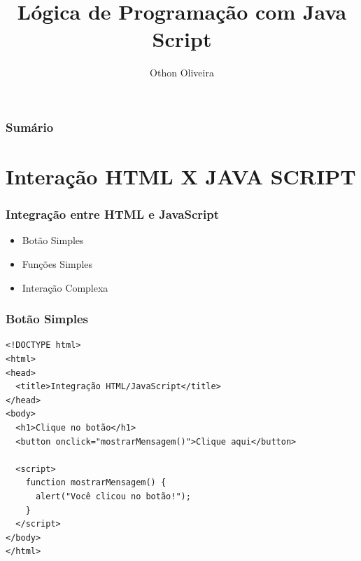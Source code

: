 \documentclass[13pt, xcolor={dvipsnames,svgnames}, portuguese]{beamer}
\author{Othon Oliveira}
\title{Lógica de Programação com Java Script}
\institute{SENAC - PROA}
\date{}
\begin{document}
\begin{frame}
\titlepage
\end{frame}

\newcommand{\capa}{
    \begin{tikzpicture}[remember picture,overlay]
        \node at (current page.south west)
            {\begin{tikzpicture}[remember picture, overlay]
                \fill[shading=radial,top color=orange,bottom color=orange,middle color=yellow] (0,0) rectangle (\paperwidth,\paperheight);
            \end{tikzpicture}
          };
    \end{tikzpicture}
}

\begin{frame}\frametitle{Sumário}
\tableofcontents
\end{frame}


\section{Interação HTML X JAVA SCRIPT}
\begin{frame}
\frametitle{Integração entre HTML e JavaScript}

\begin{itemize}
  \item Botão Simples
  \item Funções Simples
  \item Interação Complexa
\end{itemize}

\end{frame}

\begin{frame}[fragile]
\frametitle{Botão Simples}

\begin{verbatim}
<!DOCTYPE html>
<html>
<head>
  <title>Integração HTML/JavaScript</title>
</head>
<body>
  <h1>Clique no botão</h1>
  <button onclick="mostrarMensagem()">Clique aqui</button>

  <script>
    function mostrarMensagem() {
      alert("Você clicou no botão!");
    }
  </script>
</body>
</html>
\end{verbatim}

\end{frame}
\end{document}
